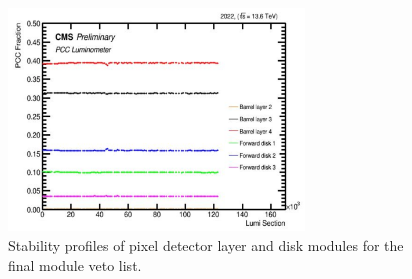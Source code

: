 \begin{figure}[!htp]
  \centering
  \includegraphics[width=0.7\textwidth]{ashish_thesis/2022_pcc_stability_2.png}
  \caption[Stability Profiles For Final Veto]{Stability profiles of pixel detector layer and disk modules for the final module veto list.}
  \label{fig:stabprof_69b}
\end{figure}


